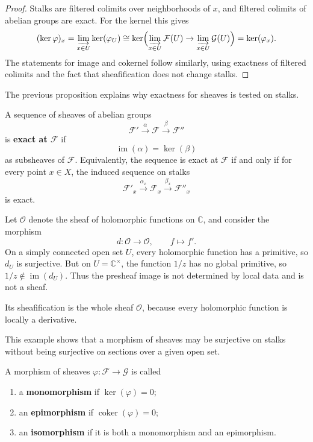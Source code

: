 \documentclass[12pt]{article}
\begin{document}
\begin{proof}
    Stalks are filtered colimits over neighborhoods of $x$, and filtered colimits of abelian groups are exact. For the kernel this gives
    \[
        (\ker \varphi)_x
        = \varinjlim_{x \in U} \ker(\varphi_U)
        \cong \ker\Bigl(\varinjlim_{x \in U} \mathcal F(U) \to \varinjlim_{x \in U} \mathcal G(U)\Bigr)
        = \ker(\varphi_x).
    \]
    The statements for image and cokernel follow similarly, using exactness of filtered colimits and the fact that sheafification does not change stalks.
\end{proof}

The previous proposition explains why exactness for sheaves is tested on stalks.

\begin{definition}
    A sequence of sheaves of abelian groups
    \[
        \mathcal F' \xrightarrow{\alpha} \mathcal F \xrightarrow{\beta} \mathcal F''
    \]
    is \textbf{exact at $\mathcal F$} if
    \[
        \operatorname{im}(\alpha) = \ker(\beta)
    \]
    as subsheaves of $\mathcal F$. Equivalently, the sequence is exact at $\mathcal F$ if and only if for every point $x \in X$, the induced sequence on stalks
    \[
        \mathcal F'_x \xrightarrow{\alpha_x} \mathcal F_x \xrightarrow{\beta_x} \mathcal F''_x
    \]
    is exact.
\end{definition}

\begin{example}
    Let $\mathcal O$ denote the sheaf of holomorphic functions on $\mathbb C$, and consider the morphism
    \[
        d : \mathcal O \to \mathcal O,
        \qquad f \mapsto f'.
    \]
    On a simply connected open set $U$, every holomorphic function has a primitive, so $d_U$ is surjective. But on $U = \mathbb{C}^{\times}$, the function $1/z$ has no global primitive, so $1/z \notin \operatorname{im}(d_U)$. Thus the presheaf image is not determined by local data and is not a sheaf.

    Its sheafification is the whole sheaf $\mathcal O$, because every holomorphic function is locally a derivative.
\end{example}

This example shows that a morphism of sheaves may be surjective on stalks without being surjective on sections over a given open set.

\begin{definition}
    A morphism of sheaves $\varphi : \mathcal F \to \mathcal G$ is called
    \begin{enumerate}
        \item a \textbf{monomorphism} if $\ker(\varphi)=0$;
        \item an \textbf{epimorphism} if $\operatorname{coker}(\varphi)=0$;
        \item an \textbf{isomorphism} if it is both a monomorphism and an epimorphism.
    \end{enumerate}
\end{definition}
\end{document}
